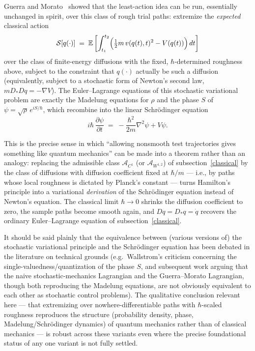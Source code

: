 Guerra and Morato~\cite{GuerraMorato1983} showed that the least-action idea can
be run, essentially unchanged in spirit, over this class of rough trial paths:
extremize the \emph{expected} classical action
\[
\mathcal{S}[q(\cdot)] \;=\; \mathbb{E}\left[\int_{t_1}^{t_2} \Bigl(\tfrac12 m\, v(q(t),t)^2 - V(q(t))\Bigr)\,dt\right]
\]
over the class of finite-energy diffusions with the fixed, $\hbar$-determined
roughness above, subject to the constraint that $q(\cdot)$ actually be such a
diffusion (equivalently, subject to a stochastic form of Newton's second law,
$mD_\ast Dq = -\nabla V$). The Euler--Lagrange equations of this stochastic
variational problem are exactly the Madelung equations for $\rho$ and the phase
$S$ of $\psi=\sqrt\rho\,e^{iS/\hbar}$, which recombine into the linear
Schr\"odinger equation
\[
i\hbar\,\frac{\partial\psi}{\partial t} \;=\; -\frac{\hbar^2}{2m}\nabla^2\psi + V\psi.
\]

This is the precise sense in which ``allowing nonsmooth test trajectories gives
something like quantum mechanics'' can be made into a theorem rather than an
analogy: replacing the admissible class $\mathcal{A}_{C^1}$ (or
$\mathcal{A}_{W^{1,2}}$) of subsection~\ref{classical} by the class of
diffusions with diffusion coefficient fixed at $\hbar/m$ --- i.e., by paths
whose local roughness is dictated by Planck's constant --- turns Hamilton's
principle into a variational \emph{derivation} of the Schr\"odinger equation
instead of Newton's equation. The classical limit $\hbar\to 0$ shrinks the
diffusion coefficient to zero, the sample paths become smooth again, and
$Dq=D_\ast q=\dot q$ recovers the ordinary Euler--Lagrange equation of
subsection~\ref{classical}.

\begin{remark}
It should be said plainly that the equivalence between (various versions of)
    the stochastic variational principle and the Schr\"odinger equation has
    been debated in the literature on technical grounds (e.g.\ Wallstrom's
    criticism concerning the single-valuedness/quantization of the phase $S$,
    and subsequent work arguing that the naive stochastic-mechanics Lagrangian
    and the Guerra--Morato Lagrangian, though both reproducing the Madelung
    equations, are not obviously equivalent to each other as stochastic control
    problems). The qualitative conclusion relevant here --- that extremizing
    over nowhere-differentiable paths with $\hbar$-scaled roughness reproduces
    the structure (probability density, phase, Madelung/Schr\"odinger dynamics)
    of quantum mechanics rather than of classical mechanics --- is robust
    across these variants even where the precise foundational status of any one
    variant is not fully settled.
\end{remark}

